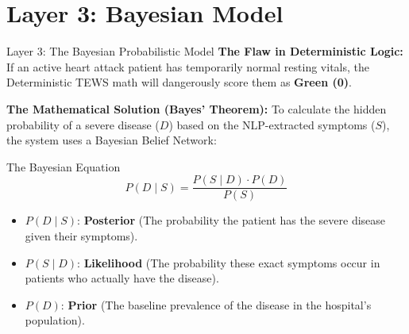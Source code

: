 \documentclass[11pt, aspectratio=169]{beamer}
\begin{document}
\section{Layer 3: Bayesian Model}
\begin{frame}{Layer 3: The Bayesian Probabilistic Model}
	\textbf{The Flaw in Deterministic Logic:}
	If an active heart attack patient has temporarily normal resting vitals, the Deterministic TEWS math will dangerously score them as \textbf{\textcolor{triageGreen}{Green (0)}}.
	\vspace{0.1cm}
	
	\textbf{The Mathematical Solution (Bayes' Theorem):}
	To calculate the hidden probability of a severe disease ($D$) based on the NLP-extracted symptoms ($S$), the system uses a Bayesian Belief Network:
	\begin{block}{The Bayesian Equation}
		\[
		P(D \mid S) = \frac{P(S \mid D) \cdot P(D)}{P(S)}
		\]
	\end{block}
	\begin{itemize}
		\item $P(D \mid S)$: \textbf{Posterior} (The probability the patient has the severe disease given their symptoms).
		\item $P(S \mid D)$: \textbf{Likelihood} (The probability these exact symptoms occur in patients who actually have the disease).
		\item $P(D)$: \textbf{Prior} (The baseline prevalence of the disease in the hospital's population).
	\end{itemize}
\end{frame}
\end{document}
